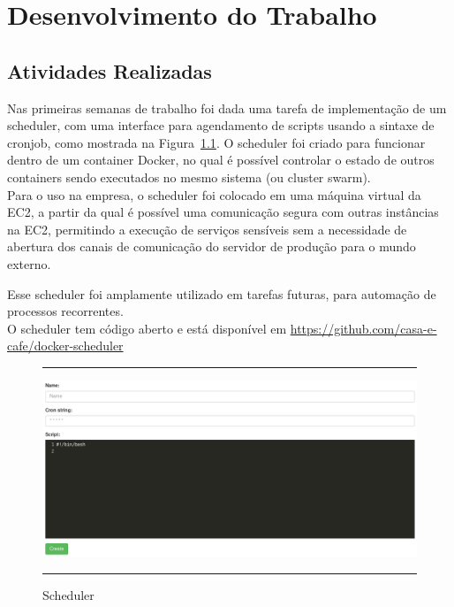 \chapter{Desenvolvimento do Trabalho}\label{chap:atividadesRealizadas}


\section{Atividades Realizadas}

Nas primeiras semanas de trabalho foi dada uma tarefa de implementação de um \gls{scheduler}, com uma interface para agendamento de scripts usando a sintaxe de \gls{cronjob}, como mostrada na Figura~\ref{fig:scheduler}. O \gls{scheduler} foi criado para funcionar dentro de um \gls{container} \gls{Docker}, no qual é possível controlar o estado de outros \glspl{container} sendo executados no mesmo sistema (ou \gls{cluster swarm}).\\

Para o uso na empresa, o \gls{scheduler} foi colocado em uma máquina virtual da \gls{EC2}, a partir da qual é possível uma comunicação segura com outras instâncias na \gls{EC2}, permitindo a execução de serviços sensíveis sem a necessidade de abertura dos canais de comunicação do servidor de produção para o mundo externo.

Esse \gls{scheduler} foi amplamente utilizado em tarefas futuras, para automação de processos recorrentes.\\

O \gls{scheduler} tem código aberto e está disponível em \url{https://github.com/casa-e-cafe/docker-scheduler}\\

\begin{figure}[h]
  \rule[1ex]{\textwidth}{0.25pt}
  \centering\includegraphics[width=1.00\textwidth]{img/scheduler.png}
  \caption[Scheduler]
  {Scheduler}\label{fig:scheduler}
  \rule[1ex]{\textwidth}{0.25pt}
\end{figure}

